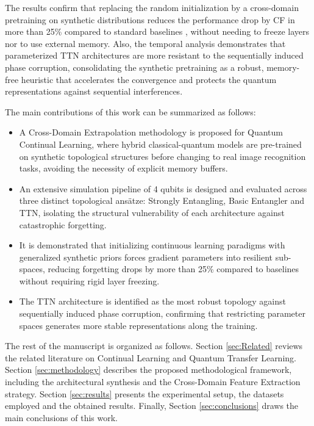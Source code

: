 \documentclass[conference]{IEEEtran}
\begin{document}
The results confirm that replacing the random initialization by a cross-domain pretraining on synthetic distributions reduces the performance drop by CF in more than 25\% compared to standard baselines \cite{buzzega2020dark,kirkpatrick2017overcoming}, without needing to freeze layers nor to use external memory. Also, the temporal analysis demonstrates that parameterized TTN architectures  are more resistant to the sequentially induced phase corruption, consolidating the synthetic pretraining as a robust, memory-free heuristic that accelerates the convergence \cite{Mitarai18} and protects the quantum representations against sequential interferences.

The main contributions of this work can be summarized as follows:

\begin{itemize}
    \item A Cross-Domain Extrapolation methodology is proposed for Quantum Continual Learning, where hybrid classical-quantum models are pre-trained on synthetic topological structures before changing to real image recognition tasks, avoiding the necessity of explicit memory buffers.

    \item An extensive simulation pipeline of 4 qubits is designed and evaluated across three distinct topological ansätze: Strongly Entangling, Basic Entangler and TTN, isolating the structural vulnerability of each architecture against catastrophic forgetting.

    \item It is demonstrated that initializing continuous learning paradigms with generalized synthetic priors forces gradient parameters into resilient sub-spaces, reducing forgetting drops by more than 25\% compared to baselines without requiring rigid layer freezing.

    \item The TTN architecture is identified as the most robust topology against sequentially induced phase corruption, confirming that restricting parameter spaces generates more stable representations along the training.
\end{itemize}

The rest of the manuscript is organized as follows. Section \ref{sec:Related} reviews the related literature on Continual Learning and Quantum Transfer Learning. Section \ref{sec:methodology} describes the proposed methodological framework, including the architectural synthesis and the Cross-Domain Feature Extraction strategy. Section \ref{sec:results} presents the experimental setup, the datasets employed and the obtained results. Finally, Section \ref{sec:conclusions} draws the main conclusions of this work.
\end{document}
